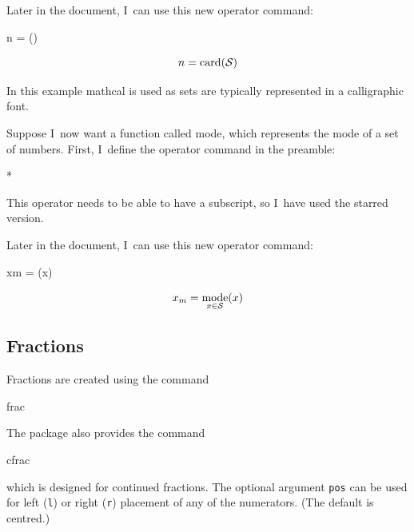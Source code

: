 Later in the document, I~can use this new operator command:
\begin{codeS}
 n = () 
\end{codeS}%
\begin{resultS}
\[
n = \operatorname{card}(\mathcal{S})
\]
\end{resultS}%
In this example \gls{mathcal} is used as sets are
typically represented in a calligraphic font.


Suppose I~now want a function called mode, which represents the
mode of a set of numbers. First, I~define the operator command in the
preamble:
\begin{codeS}
*
\end{codeS}
This operator needs to be able to have a subscript, so I~have used
the starred version.

Later in the document, I~can use this new operator command:
\begin{codeS}
 xm = 
(x)
\end{codeS}
\begin{resultS}
\[
x_m = \operatorname*{mode}_{x \in \mathcal{S}}(x)
\]
\end{resultS}


\bookpagebreak
{}
\subsection{Fractions}
\label{sec:fractions}

Fractions are created using the command
\begin{definition}
\gls{frac}
\end{definition}
The  package also provides the command
\begin{definition}
\gls{cfrac}
\end{definition}
which is designed for continued fractions. The optional argument
\texttt{pos} can be used for left (\texttt{l}) or right (\texttt{r})
placement of any of the numerators. (The default is centred.)

